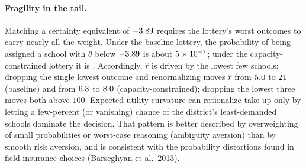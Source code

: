 \documentclass{article}
\begin{document}
\paragraph{Fragility in the tail.} Matching a certainty equivalent of $-3.89$ requires the lottery's worst outcomes to carry nearly all the weight. Under the baseline lottery, the probability of being assigned a school with $\theta$ below $-3.89$ is about $5 \times 10^{-7}$; under the capacity-constrained lottery it is \numProbBelowCEcap. Accordingly, $\hat r$ is driven by the lowest few schools: dropping the single lowest outcome and renormalizing moves $\hat r$ from $5.0$ to $21$ (baseline) and from $6.3$ to $8.0$ (capacity-constrained); dropping the lowest three moves both above $100$. Expected-utility curvature can rationalize \numTakeup{} take-up only by letting a few-percent (or vanishing) chance of the district's least-demanded schools dominate the decision. That pattern is better described by overweighting of small probabilities or worst-case reasoning (ambiguity aversion) than by smooth risk aversion, and is consistent with the probability distortions found in field insurance choices (Barseghyan et al.\ 2013).
\end{document}
